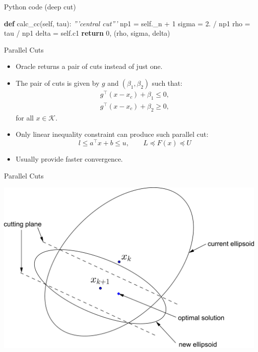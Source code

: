 \documentclass[10pt,ignorenonframetext,serif,onlymath]{beamer}
\newenvironment{Shaded}{}{}
\newcommand{\CommentTok}[1]{\textcolor[rgb]{0.38,0.63,0.69}{\textit{#1}}}
\newcommand{\ControlFlowTok}[1]{\textcolor[rgb]{0.00,0.44,0.13}{\textbf{#1}}}
\newcommand{\DecValTok}[1]{\textcolor[rgb]{0.25,0.63,0.44}{#1}}
\newcommand{\FloatTok}[1]{\textcolor[rgb]{0.25,0.63,0.44}{#1}}
\newcommand{\KeywordTok}[1]{\textcolor[rgb]{0.00,0.44,0.13}{\textbf{#1}}}
\newcommand{\NormalTok}[1]{#1}
\newcommand{\OperatorTok}[1]{\textcolor[rgb]{0.40,0.40,0.40}{#1}}
\newcommand{\VariableTok}[1]{\textcolor[rgb]{0.10,0.09,0.49}{#1}}
\begin{document}
\begin{frame}[fragile]{Python code (deep cut)}
\protect\hypertarget{python-code-deep-cut-1}{}

\begin{Shaded}
\begin{Highlighting}[]
\KeywordTok{def}\NormalTok{ calc_cc(}\VariableTok{self}\NormalTok{, tau):}
    \CommentTok{'''central cut'''}
\NormalTok{    np1 }\OperatorTok{=} \VariableTok{self}\NormalTok{._n }\OperatorTok{+} \DecValTok{1}
\NormalTok{    sigma }\OperatorTok{=} \FloatTok{2.} \OperatorTok{/}\NormalTok{ np1}
\NormalTok{    rho }\OperatorTok{=}\NormalTok{ tau }\OperatorTok{/}\NormalTok{ np1}
\NormalTok{    delta }\OperatorTok{=} \VariableTok{self}\NormalTok{.c1}
    \ControlFlowTok{return} \DecValTok{0}\NormalTok{, (rho, sigma, delta)}
\end{Highlighting}
\end{Shaded}

\end{frame}

\begin{frame}{Parallel Cuts}
\protect\hypertarget{parallel-cuts}{}

\begin{itemize}
\item
  Oracle returns a pair of cuts instead of just one.
\item
  The pair of cuts is given by \(g\) and \((\beta_1, \beta_2)\) such
  that: \[\begin{array}{l}
  g^\top (x - x_c) + \beta_1 \leq 0,  \\
  g^\top (x - x_c) + \beta_2 \geq 0,
  \end{array}\] for all \(x \in \mathcal{K}\).
\item
  Only linear inequality constraint can produce such parallel cut:
  \[ l \leq a^\top x + b \leq u, \qquad L \preceq F(x) \preceq U \]
\item
  Usually provide faster convergence.
\end{itemize}

\end{frame}

\begin{frame}{Parallel Cuts}
\protect\hypertarget{parallel-cuts-1}{}

\includegraphics{ellipsoid.files/parallel_cut.pdf}

\end{frame}
\end{document}
